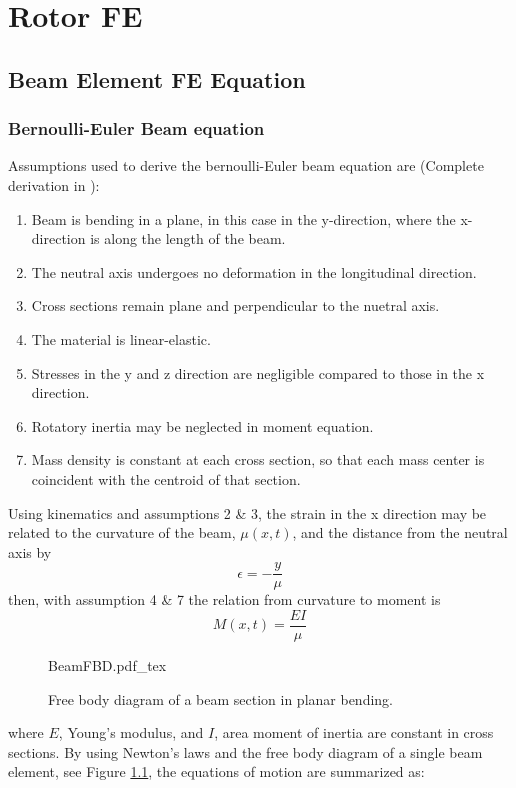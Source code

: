 \chapter{Rotor FE}
\section{Beam Element FE Equation}
\subsection{Bernoulli-Euler Beam equation}
Assumptions used to derive the bernoulli-Euler beam equation are (Complete derivation in \cite{craig2006fundamentals}):
\begin{enumerate}
	\item Beam is bending in a plane, in this case in the y-direction, where the x-direction is along the length of the beam.
	\item The  neutral axis undergoes no deformation in the longitudinal direction.
	\item Cross sections remain plane and perpendicular to the nuetral axis.
	\item The material is linear-elastic.
	\item Stresses in the y and z direction are negligible compared to those in the x direction.
	\item Rotatory inertia may be neglected in moment equation.
	\item Mass density is constant at each cross section, so that each mass center is coincident with the centroid of that section.
\end{enumerate}
Using kinematics and assumptions 2 \& 3, the strain in the x direction may be related to the curvature of the beam, $\mu(x,t)$, and the distance from the neutral axis by
\begin{equation} \label{eq:curvature}
\epsilon=-\dfrac{y}{\mu}
\end{equation}
then, with assumption 4 \& 7 the relation from curvature to moment is
\begin{equation} \label{eq:curv_moment}
M(x,t)=\dfrac{EI}{\mu}
\end{equation}
\begin{figure}
	\centering
	\def\svgwidth{300pt}
	{BeamFBD.pdf_tex}
	\caption{Free body diagram of a beam section in planar bending.}
	\label{fig:BeamFBD}
\end{figure}
where $ E $, Young's modulus, and $ I $, area moment of inertia are constant in cross sections. By using Newton's laws and the free body diagram of a single beam element, see Figure \ref{fig:BeamFBD}, the equations of motion are summarized as:
